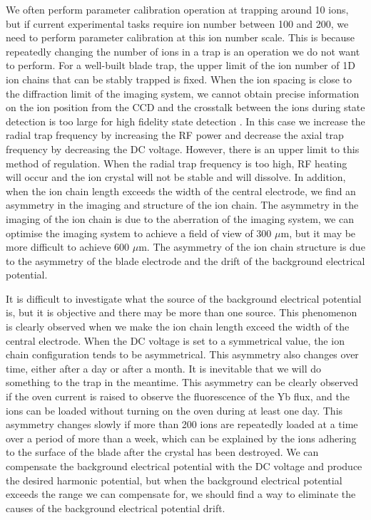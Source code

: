We often perform parameter calibration operation at trapping around 10 ions, but if current experimental tasks require ion number between 100 and 200, we need to perform parameter calibration at this ion number scale. This is because repeatedly changing the number of ions in a trap is an operation we do not want to perform. For a well-built blade trap, the upper limit of the ion number of 1D ion chains that can be stably trapped is fixed. When the ion spacing is close to the diffraction limit of the imaging system, we cannot obtain precise information on the ion position from the CCD and the crosstalk between the ions during state detection is too large for high fidelity state detection \cite{RN220,RN150,RN223}. In this case we increase the radial trap frequency by increasing the RF power and decrease the axial trap frequency by decreasing the DC voltage. However, there is an upper limit to this method of regulation. When the radial trap frequency is too high, RF heating will occur and the ion crystal will not be stable and will dissolve. In addition, when the ion chain length exceeds the width of the central electrode, we find an asymmetry in the imaging and structure of the ion chain. The asymmetry in the imaging of the ion chain is due to the aberration of the imaging system, we can optimise the imaging system to achieve a field of view of 300 $\mu$m, but it may be more difficult to achieve 600 $\mu$m. The asymmetry of the ion chain structure is due to the asymmetry of the blade electrode and the drift of the background electrical potential.

It is difficult to investigate what the source of the background electrical potential is, but it is objective and there may be more than one source. This phenomenon is clearly observed when we make the ion chain length exceed the width of the central electrode. When the DC voltage is set to a symmetrical value, the ion chain configuration tends to be asymmetrical. This asymmetry also changes over time, either after a day or after a month. It is inevitable that we will do something to the trap in the meantime. This asymmetry can be clearly observed if the oven current is raised to observe the fluorescence of the Yb flux, and the ions can be loaded without turning on the oven during at least one day. This asymmetry changes slowly if more than 200 ions are repeatedly loaded at a time over a period of more than a week, which can be explained by the ions adhering to the surface of the blade after the crystal has been destroyed. We can compensate the background electrical potential with the DC voltage and produce the desired harmonic potential, but when the background electrical potential exceeds the range we can compensate for, we should find a way to eliminate the causes of the background electrical potential drift.

